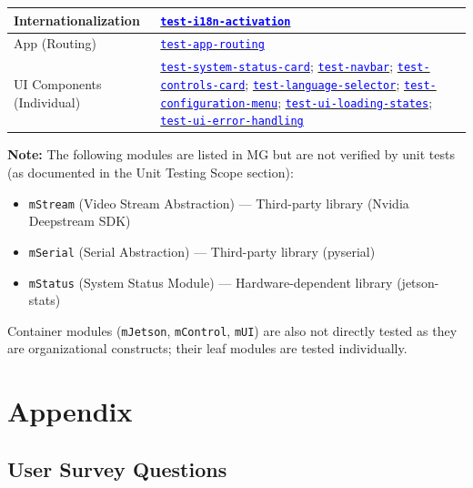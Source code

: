 \documentclass[12pt, titlepage]{article}
\newcommand{\mref}[1]{\texttt{#1}}
\newcommand{\tid}[1]{\hyperlink{tid:#1}{\textcolor{blue}{\texttt{#1}}}}
\begin{document}
\begin{table}[H]
\begin{tabular}{|p{4.5cm}|p{10cm}|}
    \hline
    Internationalization                     & \tid{test-i18n-activation}                                                                                                                                                                                  \\
    \hline
    App (Routing)                            & \tid{test-app-routing}                                                                                                                                                                                      \\
    \hline
    UI Components (Individual)               & \tid{test-system-status-card}; \tid{test-navbar}; \tid{test-controls-card}; \tid{test-language-selector}; \tid{test-configuration-menu}; \tid{test-ui-loading-states}; \tid{test-ui-error-handling}         \\
    \hline
  \end{tabular}
\end{table}

\textbf{Note:} The following modules are listed in MG but are not verified by unit tests (as documented in the Unit Testing Scope section):
\begin{itemize}
  \item \mref{mStream} (Video Stream Abstraction) --- Third-party library (Nvidia Deepstream SDK)
  \item \mref{mSerial} (Serial Abstraction) --- Third-party library (pyserial)
  \item \mref{mStatus} (System Status Module) --- Hardware-dependent library (jetson-stats)
\end{itemize}

Container modules (\mref{mJetson}, \mref{mControl}, \mref{mUI}) are also not
directly tested as they are organizational constructs; their leaf modules are
tested individually.





\newpage

\section{Appendix}

\subsection{User Survey Questions}
\end{document}
